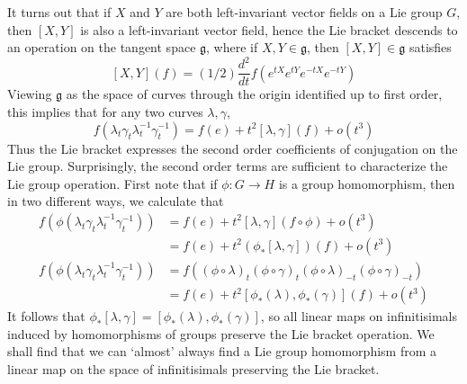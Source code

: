 It turns out that if $X$ and $Y$ are both left-invariant vector fields on a Lie group $G$, then $[X,Y]$ is also a left-invariant vector field, hence the Lie bracket descends to an operation on the tangent space $\mathfrak{g}$, where if $X,Y \in \mathfrak{g}$, then $[X,Y] \in \mathfrak{g}$ satisfies
%
\[ [X,Y](f) = (1/2) \frac{d^2}{dt} f(e^{tX} e^{tY} e^{-tX} e^{-tY}) \]
%
Viewing $\mathfrak{g}$ as the space of curves through the origin identified up to first order, this implies that for any two curves $\lambda, \gamma$,
%
\[ f(\lambda_t \gamma_t \lambda^{-1}_t \gamma^{-1}_t) = f(e) + t^2 [\lambda, \gamma](f) + o(t^3) \]
%
Thus the Lie bracket expresses the second order coefficients of conjugation on the Lie group. Surprisingly, the second order terms are sufficient to characterize the Lie group operation. First note that if $\phi: G \to H$ is a group homomorphism, then in two different ways, we calculate that
%
\begin{align*}
     f(\phi(\lambda_t \gamma_t \lambda^{-1}_t \gamma^{-1}_t)) &= f(e) + t^2[\lambda, \gamma](f \circ \phi) + o(t^3)\\
     &= f(e) + t^2 (\phi_*[\lambda, \gamma])(f) + o(t^3)\\
    f(\phi(\lambda_t \gamma_t \lambda^{-1}_t \gamma^{-1}_t)) &= f((\phi \circ \lambda)_t (\phi \circ \gamma)_t (\phi \circ \lambda)_{-t} (\phi \circ \gamma)_{-t})\\
     &= f(e) + t^2 [\phi_*(\lambda), \phi_*(\gamma)](f) + o(t^3)
\end{align*}
%
It follows that $\phi_*[\lambda, \gamma] = [\phi_*(\lambda), \phi_*(\gamma)]$, so all linear maps on infinitisimals induced by homomorphisms of groups preserve the Lie bracket operation. We shall find that we can `almost' always find a Lie group homomorphism from a linear map on the space of infinitisimals preserving the Lie bracket.

